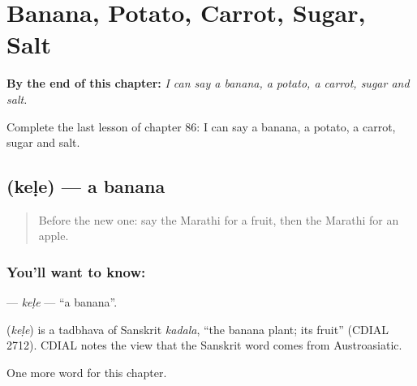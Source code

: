 
\chapter{Banana, Potato, Carrot, Sugar, Salt}
\label{ch:mr-banana-potato-carrot-sugar-salt}

\begin{chapteropening}
\textbf{By the end of this chapter:} \emph{I can say a banana, a potato, a carrot, sugar and salt.}

Complete the last lesson of chapter 86: I can say a banana, a potato, a carrot, sugar and salt.
\end{chapteropening}

\section[\texorpdfstring{\mr{केळे} (keḷe)}{केळे (keḷe)}]{ (keḷe) — a banana}

\label{lesson:MR-C86-kele}



\begin{quote}
Before the new one: say the Marathi for a fruit, then the Marathi for an apple.
\end{quote}

\subsection*{You'll want to know: }
\textbf{} — \emph{keḷe} — \textquotedblleft{}a banana\textquotedblright{}.

\begin{cousinweb}
\textbf{} (\emph{keḷe}) is a tadbhava of Sanskrit \emph{kadala}, \textquotedblleft{}the banana plant; its fruit\textquotedblright{} (CDIAL 2712). CDIAL notes the view that the Sanskrit word comes from Austroasiatic.
\end{cousinweb}

\begin{grammarlens}[title={What you've built}]
One more word for this chapter.
\end{grammarlens}

